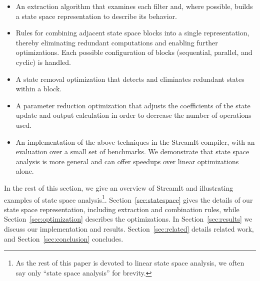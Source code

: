 \begin{itemize}

\vspace{\itemshrink} \item An extraction algorithm that examines each
filter and, where possible, builds a state space representation to
describe its behavior.

\vspace{\itemshrink} \item Rules for combining adjacent state space
blocks into a single representation, thereby eliminating redundant
computations and enabling further optimizations.  Each possible
configuration of blocks (sequential, parallel, and cyclic) is handled.

\vspace{\itemshrink} \item A state removal optimization that detects
and eliminates redundant states within a block.

\vspace{\itemshrink} \item A parameter reduction optimization that
adjusts the coefficients of the state update and output calculation in
order to decrease the number of operations used.

\vspace{\itemshrink} \item An implementation of the above techniques
in the StreamIt compiler, with an evaluation over a small set of
benchmarks.  We demonstrate that state space analysis is more general
and can offer speedups over linear optimizations alone.

\vspace{\itemshrink} \end{itemize}

In the rest of this section, we give an overview of StreamIt and
illustrating examples of state space analysis\footnote{As the rest of
this paper is devoted to linear state space analysis, we often say
only ``state space analysis'' for brevity.}.
Section~\ref{sec:statespace} gives the details of our state space
representation, including extraction and combination rules, while
Section~\ref{sec:optimization} describes the optimizations.  In
Section~\ref{sec:results} we discuss our implementation and results.
Section~\ref{sec:related} details related work, and
Section~\ref{sec:conclusion} concludes.


